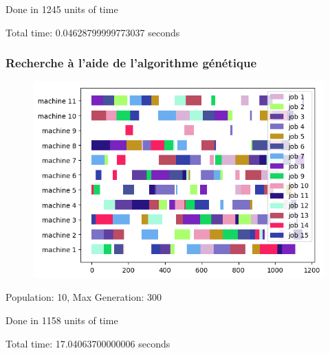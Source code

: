 Done in 1245 units of time

Total time: 0.04628799999773037 seconds 
\frameboxend

\newpage

\subsubsection{Recherche à l'aide de l'algorithme génétique}

\begin{figure}[!h]
    \centering
    \includegraphics[]{results/barnes_setb4c9_genetic.png}
\end{figure}

Population: 10, Max Generation: 300

Done in 1158 units of time

Total time: 17.04063700000006 seconds
\frameboxend